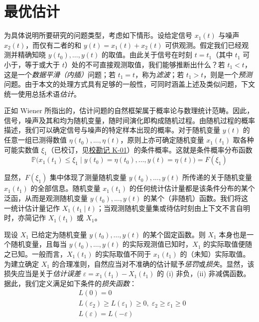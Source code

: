 \section{最优估计}\label{sec:opt}

为具体说明所要研究的问题类型，考虑如下情形。设给定信号 $x_1(t)$ 与噪声 $x_2(t)$，而仅有二者的和 $y(t) = x_1(t) + x_2(t)$ 可供观测。假定我们已经观测并精确知晓 $y(t_0), \dots, y(t)$ 的取值。由此关于信号在时刻 $t = t_1$（其中 $t_1$ 可小于，等于或大于 $t$）处的不可直接观测取值，我们能够推断出什么？若 $t_1 < t$，这是一个\emph{数据平滑（内插）}问题；若 $t_1 = t$，称为\emph{滤波}；若 $t_1 > t$，则是一个\emph{预测}问题。由于本文的处理方式具有足够的一般性，可同时涵盖上述及类似问题，下文统一使用总括术语\emph{估计}。


正如 Wiener \cite{r01} 所指出的，估计问题的自然框架属于概率论与数理统计范畴。因此，信号，噪声及其和均为随机变量，随时间演化即构成随机过程。由随机过程的概率描述，我们可以确定信号与噪声的特定样本出现的概率。对于随机变量 $y(t)$ 的任意一组已测得数值 $\eta(t_0), \dots, \eta(t)$，原则上亦可确定随机变量 $x_1(t_1)$ 取各种可能实数值 $\xi_1$（已校订，见\hyperref[sec:k01]{校勘记 K-01}）的条件概率。这就是条件概率分布函数
\begin{equation}\label{eq:1}
\mathbb{P}\bigl(x_1(t_1) \leq \xi_1 \mid y(t_0) = \eta(t_0), \dots, y(t) = \eta(t)\bigr) = F(\xi_1)
\end{equation}

显然，$F(\xi_1)$ 集中体现了测量随机变量 $y(t_0), \dots, y(t)$ 所传递的关于随机变量 $x_1(t_1)$ 的全部信息。随机变量 $x_1(t_1)$ 的任何统计估计量都是该条件分布的某个泛函，从而是观测随机变量 $y(t_0), \dots, y(t)$ 的某个（非随机）函数。我们将这一统计估计量记作 $X_1(t_1 \mid t)$；当观测随机变量集或待估时刻由上下文不言自明时，亦简记作 $X_1(t_1)$ 或 $X_1$。

现设 $X_1$ 已给定为随机变量 $y(t_0), \dots, y(t)$ 的某个固定函数。则 $X_1$ 本身也是一个随机变量，且每当 $y(t_0), \dots, y(t)$ 的实际观测值已知时，$X_1$ 的实际取值便随之已知。一般而言，$X_1(t_1)$ 的实际取值不同于 $x_1(t_1)$ 的（未知）实际取值。为建立确定 $X_1$ 的合理准则，自然应当对不准确的估计赋予\emph{惩罚}或\emph{损失}。显然，该损失应当是关于\emph{估计误差} $\varepsilon = x_1(t_1) - X_1(t_1)$ 的 (i) 非负，(ii) 非减偶函数。据此，我们定义满足如下条件的\emph{损失函数}：
\begin{equation}\label{eq:2}
\begin{aligned}
&L(0) = 0 \\
&L(\varepsilon_2) \geq L(\varepsilon_1) \geq 0,\; \varepsilon_2 \geq \varepsilon_1 \geq 0 \\
&L(\varepsilon) = L(-\varepsilon)
\end{aligned}
\end{equation}


